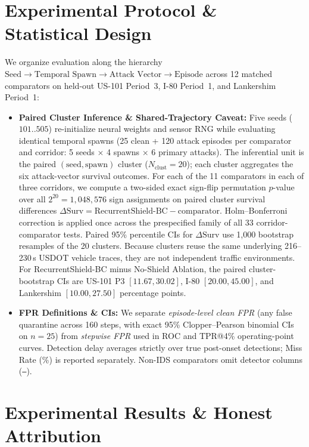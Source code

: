 \documentclass[journal]{IEEEtran}
\begin{document}
\section{Experimental Protocol \& Statistical Design}
We organize evaluation along the hierarchy $\text{Seed} \to \text{Temporal Spawn} \to \text{Attack Vector} \to \text{Episode}$ across 12 matched comparators on held-out US-101 Period~3, I-80 Period~1, and Lankershim Period~1:
\begin{itemize}
    \item \textbf{Paired Cluster Inference \& Shared-Trajectory Caveat:} Five seeds ($101..505$) re-initialize neural weights and sensor RNG while evaluating identical temporal spawns (25 clean + 120 attack episodes per comparator and corridor: 5 seeds $\times$ 4 spawns $\times$ 6 primary attacks). The inferential unit is the paired $(\text{seed},\text{spawn})$ cluster ($N_{\text{clust}}=20$); each cluster aggregates the six attack-vector survival outcomes. For each of the 11 comparators in each of three corridors, we compute a two-sided exact sign-flip permutation $p$-value over all $2^{20}=1{,}048{,}576$ sign assignments on paired cluster survival differences $\Delta\text{Surv}=\text{RecurrentShield-BC}-\text{comparator}$. Holm--Bonferroni correction is applied once across the prespecified family of all 33 corridor-comparator tests. Paired 95\% percentile CIs for $\Delta\text{Surv}$ use 1,000 bootstrap resamples of the 20 clusters. Because clusters reuse the same underlying 216--230\,s USDOT vehicle traces, they are not independent traffic environments.
    For RecurrentShield-BC minus No-Shield Ablation, the paired cluster-bootstrap CIs are US-101 P3 $[11.67,30.02]$, I-80 $[20.00,45.00]$, and Lankershim $[10.00,27.50]$ percentage points.
    \item \textbf{FPR Definitions \& CIs:} We separate \textit{episode-level clean FPR} (any false quarantine across 160 steps, with exact 95\% Clopper--Pearson binomial CIs on $n=25$) from \textit{stepwise FPR} used in ROC and TPR@4\% operating-point curves. Detection delay averages strictly over true post-onset detections; Miss Rate (\%) is reported separately. Non-IDS comparators omit detector columns (\texttt{--}).
\end{itemize}

\section{Experimental Results \& Honest Attribution}
\end{document}
